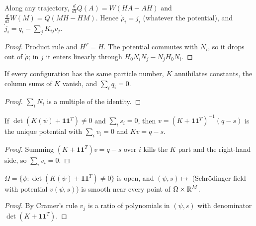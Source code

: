 \begin{theorem}
  \label{thm:force_balance}
  \leanok
  Along any trajectory, $\frac{d}{dt}Q(A)=W(HA-AH)$ and $\frac{d}{dt}W(M)=Q(MH-HM)$. Hence $\dot\rho_i=j_i$
  (whatever the potential), and $\dot j_i=q_i-\sum_jK_{ij}v_j$.
\end{theorem}
\begin{proof}
  \leanok
  Product rule and $H^T=H$. The potential commutes with $N_i$, so it drops out of $\dot\rho$; in $\dot j$
  it enters linearly through $H_0N_iN_j-N_jH_0N_i$.
\end{proof}

\begin{lemma}
  \label{lem:gauge}
  \leanok
  If every configuration has the same particle number, $K$ annihilates constants, the column sums of $K$
  vanish, and $\sum_iq_i=0$.
\end{lemma}
\begin{proof}
  \leanok
  $\sum_iN_i$ is a multiple of the identity.
\end{proof}

\begin{theorem}
  \label{thm:vfb}
  \leanok
  If $\det(K(\psi)+\mathbf 1\mathbf 1^T)\ne0$ and $\sum_is_i=0$, then $v=(K+\mathbf 1\mathbf 1^T)^{-1}(q-s)$
  is the unique potential with $\sum_iv_i=0$ and $Kv=q-s$.
\end{theorem}
\begin{proof}
  \leanok
  Summing $(K+\mathbf 1\mathbf 1^T)v=q-s$ over $i$ kills the $K$ part and the right-hand side, so
  $\sum_iv_i=0$.
\end{proof}

\begin{theorem}
  \label{thm:smooth_field}
  \leanok
  $\Omega=\{\psi:\det(K(\psi)+\mathbf 1\mathbf 1^T)\ne0\}$ is open, and
  $(\psi,s)\mapsto$ (Schr\"odinger field with potential $v(\psi,s)$) is smooth near every point of
  $\Omega\times\mathbb{R}^M$.
\end{theorem}
\begin{proof}
  \leanok
  By Cramer's rule $v_j$ is a ratio of polynomials in $(\psi,s)$ with denominator $\det(K+\mathbf 1\mathbf 1^T)$.
\end{proof}

